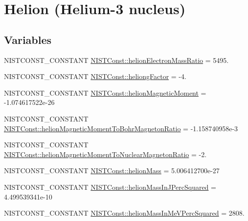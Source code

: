\hypertarget{group___n_i_s_t_const-_helion}{}\section{Helion (Helium-\/3 nucleus)}
\label{group___n_i_s_t_const-_helion}
\subsection*{Variables}
\begin{DoxyCompactItemize}
\item 
N\+I\+S\+T\+C\+O\+N\+S\+T\+\_\+\+C\+O\+N\+S\+T\+A\+NT \mbox{\hyperlink{group___n_i_s_t_const-_helion_gadf681c0ed9b5f3fe2e62e225f129f699}{N\+I\+S\+T\+Const\+::helion\+Electron\+Mass\+Ratio}} = 5495.
\item 
N\+I\+S\+T\+C\+O\+N\+S\+T\+\_\+\+C\+O\+N\+S\+T\+A\+NT \mbox{\hyperlink{group___n_i_s_t_const-_helion_ga303daafecd6acf5afbe8f2c445c18c0f}{N\+I\+S\+T\+Const\+::heliong\+Factor}} = -\/4.
\item 
N\+I\+S\+T\+C\+O\+N\+S\+T\+\_\+\+C\+O\+N\+S\+T\+A\+NT \mbox{\hyperlink{group___n_i_s_t_const-_helion_ga83ec662aeec1a0bfedbfee91f5f7ac82}{N\+I\+S\+T\+Const\+::helion\+Magnetic\+Moment}} = -\/1.\+074617522e-\/26
\item 
N\+I\+S\+T\+C\+O\+N\+S\+T\+\_\+\+C\+O\+N\+S\+T\+A\+NT \mbox{\hyperlink{group___n_i_s_t_const-_helion_gad4975796a0210fccba98195f197e9c68}{N\+I\+S\+T\+Const\+::helion\+Magnetic\+Moment\+To\+Bohr\+Magneton\+Ratio}} = -\/1.\+158740958e-\/3
\item 
N\+I\+S\+T\+C\+O\+N\+S\+T\+\_\+\+C\+O\+N\+S\+T\+A\+NT \mbox{\hyperlink{group___n_i_s_t_const-_helion_ga8de697d928cd6d251f71e4eac6897d5a}{N\+I\+S\+T\+Const\+::helion\+Magnetic\+Moment\+To\+Nuclear\+Magneton\+Ratio}} = -\/2.
\item 
N\+I\+S\+T\+C\+O\+N\+S\+T\+\_\+\+C\+O\+N\+S\+T\+A\+NT \mbox{\hyperlink{group___n_i_s_t_const-_helion_ga430422e49132ee63ad7ca1371cd87d8f}{N\+I\+S\+T\+Const\+::helion\+Mass}} = 5.\+006412700e-\/27
\item 
N\+I\+S\+T\+C\+O\+N\+S\+T\+\_\+\+C\+O\+N\+S\+T\+A\+NT \mbox{\hyperlink{group___n_i_s_t_const-_helion_gad94a56396a8e7dee7a863c10dcca4432}{N\+I\+S\+T\+Const\+::helion\+Mass\+In\+J\+Perc\+Squared}} = 4.\+499539341e-\/10
\item 
N\+I\+S\+T\+C\+O\+N\+S\+T\+\_\+\+C\+O\+N\+S\+T\+A\+NT \mbox{\hyperlink{group___n_i_s_t_const-_helion_ga769838db6411df944c625c2c123597b5}{N\+I\+S\+T\+Const\+::helion\+Mass\+In\+Me\+V\+Perc\+Squared}} = 2808.

\end{DoxyCompactItemize}
